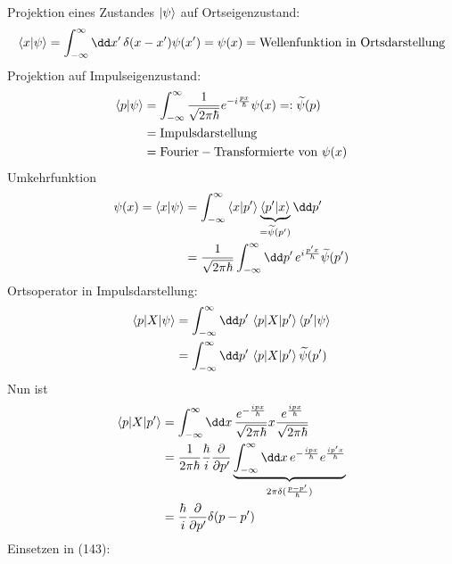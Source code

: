 \documentclass[a4paper]{scrartcl}
\begin{document}
{Projektion eines Zustandes $\ket \psi$ auf Ortseigenzustand:
\begin{align}
\braket{ x | \psi} = \int_{-\infty}^\infty \dd x' \, \delta (x - x') \psi(x') = \psi(x) = \mathrm{ Wellenfunktion \ in \ Ortsdarstellung }
\end{align}
Projektion auf Impulseigenzustand:
\begin{align}
\begin{split}
\braket{ p | \psi} & = \int_{-\infty}^\infty \frac1{\sqrt{2\pi\hbar}} e^{-i \frac{px}\hbar} \psi(x) =: \widetilde \psi(p) \\
&  = \mathrm{Impulsdarstellung} \\
& = \mathrm{Fourier-Transformierte \ von \ } \psi(x)
\end{split}
\end{align}
Umkehrfunktion
\begin{align}
\begin{split}
\psi(x) = \braket{ x | \psi } & = \int_{-\infty}^\infty \braket{ x | p'} \underbrace{ \braket{ p' | x}}_{= \widetilde \psi(p')} \dd p' \\
& = \frac1{\sqrt{2 \pi \hbar}} \int_{-\infty}^\infty \dd p' \, e^{i \frac{p'x}\hbar} \widetilde \psi(p')
\end{split}
\end{align}
Ortsoperator in Impulsdarstellung:
\begin{align}
\begin{split}
\braket{ p | X | \psi} & = \int_{-\infty}^\infty \dd p' \, \braket{ p | X | p'}\braket{p' | \psi} \\
& = \int_{-\infty}^\infty \dd p' \, \braket{p | X | p'} \widetilde \psi(p')
\end{split}
\end{align}
Nun ist 
\begin{align}
\begin{split}
\braket{ p | X | p'} & = \int_{-\infty}^\infty \dd x \, \frac{ e^{ - \frac{i p x}\hbar}}{\sqrt{2\pi \hbar}} x \frac{ e^{\frac{ipx}\hbar}}{\sqrt{2 \pi \hbar}} \\
& = \frac1{{2\pi\hbar}} \frac \hbar i \frac \partial {\partial p'} \underbrace{ \int_{-\infty}^\infty \dd x \, e^{-\frac{ipx}\hbar} e^{\frac{ip'x}\hbar}}_{2 \pi \delta(\frac{p - p'}\hbar)} \\
& = \frac \hbar i \frac \partial {\partial p'} \delta(p - p')
\end{split}
\end{align}
Einsetzen in (143):
\begin{align}

\end{align}}
\end{document}
